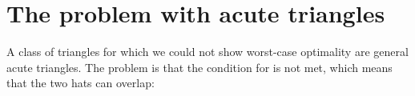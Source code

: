 \documentclass[a4paper,style=print,oneside,bibliography=totoc,nexus,lnum,extramargin]{tubsbook}
\begin{document}
%
%
%
%
%
%
%

%
%

\section{The problem with acute triangles}\label{sec:acute-triangles}

A class of triangles for which we could not show worst-case optimality are general acute triangles. The problem is that the condition for  is not met, which means that the two hats can overlap:
\end{document}
